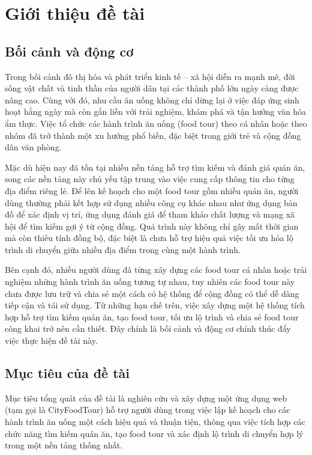 \section{Giới thiệu đề tài}
\subsection{Bối cảnh và động cơ}
Trong bối cảnh đô thị hóa và phát triển kinh tế – xã hội diễn ra mạnh mẽ, đời sống vật chất và
tinh thần của người dân tại các thành phố lớn ngày càng được nâng cao. Cùng với đó, nhu cầu
ăn uống không chỉ dừng lại ở việc đáp ứng sinh hoạt hằng ngày mà còn gắn liền với trải nghiệm,
khám phá và tận hưởng văn hóa ẩm thực. Việc tổ chức các hành trình ăn uống (food tour) theo
cá nhân hoặc theo nhóm đã trở thành một xu hướng phổ biến, đặc biệt trong giới trẻ và cộng
đồng dân văn phòng.

Mặc dù hiện nay đã tồn tại nhiều nền tảng hỗ trợ tìm kiếm và đánh giá quán ăn, song các nền
tảng này chủ yếu tập trung vào việc cung cấp thông tin cho từng địa điểm riêng lẻ. Để lên kế
hoạch cho một food tour gồm nhiều quán ăn, người dùng thường phải kết hợp sử dụng nhiều
công cụ khác nhau như ứng dụng bản đồ để xác định vị trí, ứng dụng đánh giá để tham khảo
chất lượng và mạng xã hội để tìm kiếm gợi ý từ cộng đồng. Quá trình này không chỉ gây mất
thời gian mà còn thiếu tính đồng bộ, đặc biệt là chưa hỗ trợ hiệu quả việc tối ưu hóa lộ trình di
chuyển giữa nhiều địa điểm trong cùng một hành trình.

Bên cạnh đó, nhiều người dùng đã từng xây dựng các food tour cá nhân hoặc trải nghiệm những
hành trình ăn uống tương tự nhau, tuy nhiên các food tour này chưa được lưu trữ và chia sẻ
một cách có hệ thống để cộng đồng có thể dễ dàng tiếp cận và tái sử dụng. Từ những hạn chế
trên, việc xây dựng một hệ thống tích hợp hỗ trợ tìm kiếm quán ăn, tạo food tour, tối ưu lộ trình
và chia sẻ food tour công khai trở nên cần thiết. Đây chính là bối cảnh và động cơ chính thúc
đẩy việc thực hiện đề tài này.

\subsection{Mục tiêu của đề tài}
Mục tiêu tổng quát của đề tài là nghiên cứu và xây dựng một ứng dụng web (tạm gọi là CityFoodTour) hỗ trợ người dùng trong việc lập kế hoạch cho các hành trình ăn uống một cách hiệu quả và thuận tiện, thông qua việc tích hợp các chức năng tìm kiếm quán ăn, tạo food tour và xác định lộ trình di chuyển hợp lý trong một nền tảng thống nhất.

